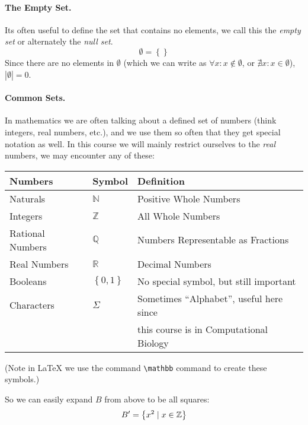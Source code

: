 \paragraph{The Empty Set.} 
Its often useful to define the set that contains no elements, we call this the \emph{empty set} or alternately the \emph{null set}. 
\[
\emptyset = \left\{\right\}
\]
Since there are no elements in $\emptyset$ (which we can write as $\forall x: x \notin \emptyset$, or $\nexists x: x \in \emptyset$), $|\emptyset| = 0$. 

\paragraph{Common Sets.}
In mathematics we are often talking about a defined set of numbers (think integers, real numbers, etc.), 
and we use them so often that they get special notation as well. 
In this course we will mainly restrict ourselves to the \textit{real} numbers, we may encounter any of these:
\begin{center}
\begin{tabular}{l|l||l}
\hline
Numbers			& Symbol			& Definition\\
\hline
\hline
Naturals 			& $\mathbb{N}$	& Positive Whole Numbers\\
Integers 			& $\mathbb{Z}$		& All Whole Numbers\\
Rational Numbers	& $\mathbb{Q}$	& Numbers Representable as Fractions\\
Real Numbers		& $\mathbb{R}$	& Decimal Numbers\\
Booleans			& $\left\{0,1\right\}$	& No special symbol, but still important\\
Characters		& $\Sigma$		& Sometimes ``Alphabet''\footnotemark, useful here since\\
				&				& \hspace{3em} this course is in Computational Biology\\
\hline
\end{tabular}
\end{center}
(Note in \LaTeX{} we use the command \texttt{\textbackslash{}mathbb} command to create these symbols.)

So we can easily expand $B$ from above to be all squares:
\[
B' = \left\{x^2 \mid x \in \operatorname{\mathbb{Z}} \right\}
\]

